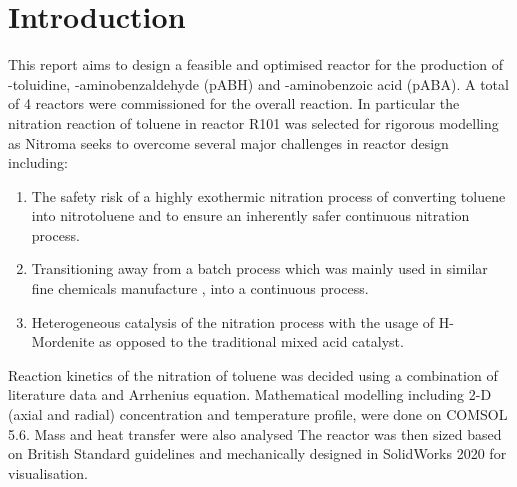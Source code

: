 \section{Introduction}
This report aims to design a feasible and optimised reactor for the production of \ortho-toluidine, \para-aminobenzaldehyde (pABH) and \para-aminobenzoic acid (pABA). A total of 4 reactors were commissioned for the overall reaction. 
In particular the nitration reaction of toluene in reactor R101 was selected for rigorous modelling as Nitroma seeks to overcome several major challenges in reactor design including:

\begin{enumerate}
    \item The safety risk of a highly exothermic nitration process of converting toluene into nitrotoluene and to ensure an inherently safer continuous nitration process. 
    \item Transitioning away from a batch process which was mainly used in similar fine chemicals manufacture \cite{di_miceli_raimondi_safety_2015}, into a continuous process. 
    \item Heterogeneous catalysis of the nitration process with the usage of H-Mordenite as opposed to the traditional mixed acid catalyst. 
\end{enumerate}

Reaction kinetics of the nitration of toluene was decided using a combination of literature data and Arrhenius equation. Mathematical modelling including 2-D (axial and radial) concentration and temperature profile, were done on COMSOL 5.6. Mass and heat transfer were also analysed  The reactor was then sized based on British Standard guidelines and mechanically designed in SolidWorks 2020 for visualisation.


